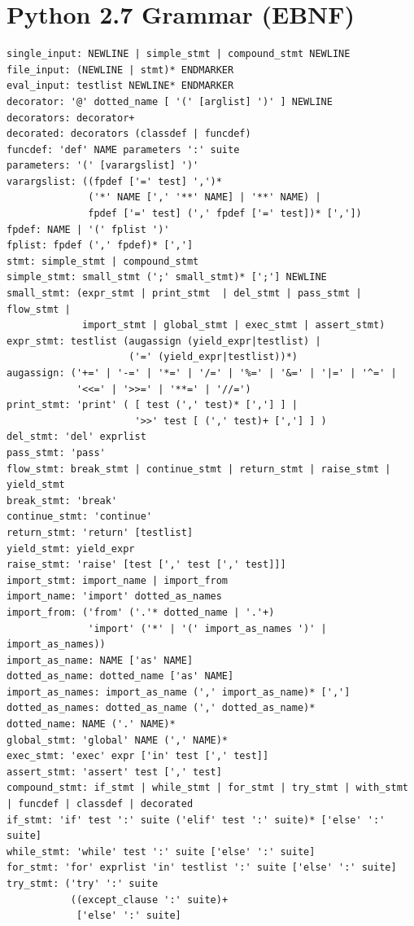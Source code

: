 \documentclass{icldt}
\numberwithin{equation}{section}       %
\begin{document}
{\chapter{Python 2.7 Grammar (EBNF)}
\label{appendix:py-grammar}
\begin{lstlisting}[breaklines]
single_input: NEWLINE | simple_stmt | compound_stmt NEWLINE
file_input: (NEWLINE | stmt)* ENDMARKER
eval_input: testlist NEWLINE* ENDMARKER
decorator: '@' dotted_name [ '(' [arglist] ')' ] NEWLINE
decorators: decorator+
decorated: decorators (classdef | funcdef)
funcdef: 'def' NAME parameters ':' suite
parameters: '(' [varargslist] ')'
varargslist: ((fpdef ['=' test] ',')*
              ('*' NAME [',' '**' NAME] | '**' NAME) |
              fpdef ['=' test] (',' fpdef ['=' test])* [','])
fpdef: NAME | '(' fplist ')'
fplist: fpdef (',' fpdef)* [',']
stmt: simple_stmt | compound_stmt
simple_stmt: small_stmt (';' small_stmt)* [';'] NEWLINE
small_stmt: (expr_stmt | print_stmt  | del_stmt | pass_stmt | flow_stmt |
             import_stmt | global_stmt | exec_stmt | assert_stmt)
expr_stmt: testlist (augassign (yield_expr|testlist) |
                     ('=' (yield_expr|testlist))*)
augassign: ('+=' | '-=' | '*=' | '/=' | '%=' | '&=' | '|=' | '^=' |
            '<<=' | '>>=' | '**=' | '//=')
print_stmt: 'print' ( [ test (',' test)* [','] ] |
                      '>>' test [ (',' test)+ [','] ] )
del_stmt: 'del' exprlist
pass_stmt: 'pass'
flow_stmt: break_stmt | continue_stmt | return_stmt | raise_stmt | yield_stmt
break_stmt: 'break'
continue_stmt: 'continue'
return_stmt: 'return' [testlist]
yield_stmt: yield_expr
raise_stmt: 'raise' [test [',' test [',' test]]]
import_stmt: import_name | import_from
import_name: 'import' dotted_as_names
import_from: ('from' ('.'* dotted_name | '.'+)
              'import' ('*' | '(' import_as_names ')' | import_as_names))
import_as_name: NAME ['as' NAME]
dotted_as_name: dotted_name ['as' NAME]
import_as_names: import_as_name (',' import_as_name)* [',']
dotted_as_names: dotted_as_name (',' dotted_as_name)*
dotted_name: NAME ('.' NAME)*
global_stmt: 'global' NAME (',' NAME)*
exec_stmt: 'exec' expr ['in' test [',' test]]
assert_stmt: 'assert' test [',' test]
compound_stmt: if_stmt | while_stmt | for_stmt | try_stmt | with_stmt | funcdef | classdef | decorated
if_stmt: 'if' test ':' suite ('elif' test ':' suite)* ['else' ':' suite]
while_stmt: 'while' test ':' suite ['else' ':' suite]
for_stmt: 'for' exprlist 'in' testlist ':' suite ['else' ':' suite]
try_stmt: ('try' ':' suite
           ((except_clause ':' suite)+
            ['else' ':' suite]

\end{lstlisting}}
\end{document}
